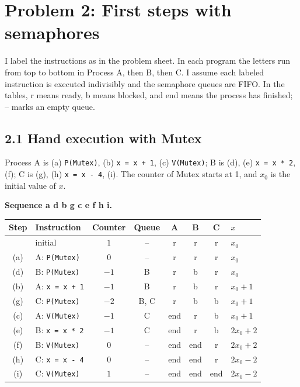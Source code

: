\documentclass[letterpaper, 11pt]{article}
\newcommand{\1}{\mathds{1}}	%
\theoremstyle{definition}
\begin{document}
\section*{Problem 2: First steps with semaphores}

I label the instructions as in the problem sheet. In each program the letters run from top to bottom in Process A, then B, then C. I assume each labeled instruction is executed indivisibly and the semaphore queues are FIFO. In the tables, r means ready, b means blocked, and end means the process has finished; -- marks an empty queue.

\subsection*{2.1 Hand execution with Mutex}

Process A is (a) \texttt{P(Mutex)}, (b) \texttt{x = x + 1}, (c) \texttt{V(Mutex)}; B is (d), (e) \texttt{x = x * 2}, (f); C is (g), (h) \texttt{x = x - 4}, (i). The counter of Mutex starts at 1, and $x_0$ is the initial value of $x$.

\textbf{Sequence a d b g c e f h i.}

\begin{center}
\begin{tabular}{clcccccl}
\toprule
Step & Instruction & Counter & Queue & A & B & C & $x$ \\
\midrule
     & initial            & $1$  & --          & r & r & r & $x_0$ \\
(a)  & A: \texttt{P(Mutex)} & $0$  & --          & r & r & r & $x_0$ \\
(d)  & B: \texttt{P(Mutex)} & $-1$ & B           & r & b & r & $x_0$ \\
(b)  & A: \texttt{x = x + 1} & $-1$ & B          & r & b & r & $x_0 + 1$ \\
(g)  & C: \texttt{P(Mutex)} & $-2$ & B, C        & r & b & b & $x_0 + 1$ \\
(c)  & A: \texttt{V(Mutex)} & $-1$ & C           & end & r & b & $x_0 + 1$ \\
(e)  & B: \texttt{x = x * 2} & $-1$ & C          & end & r & b & $2x_0 + 2$ \\
(f)  & B: \texttt{V(Mutex)} & $0$  & --          & end & end & r & $2x_0 + 2$ \\
(h)  & C: \texttt{x = x - 4} & $0$ & --          & end & end & r & $2x_0 - 2$ \\
(i)  & C: \texttt{V(Mutex)} & $1$  & --          & end & end & end & $2x_0 - 2$ \\
\bottomrule
\end{tabular}
\end{center}
\end{document}
